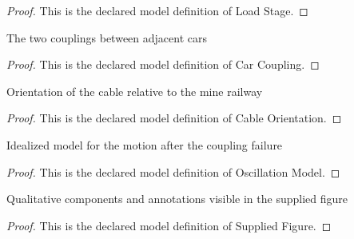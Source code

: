 \begin{proof}
  This is the declared model definition of Load Stage.
\end{proof}
\begin{definition}
  \label{def:physics:phyx-mini-0271:phyxminiproblems-problemphyxmini0271-carcoupling}
  The two couplings between adjacent cars
\end{definition}
\begin{proof}
  This is the declared model definition of Car Coupling.
\end{proof}
\begin{definition}
  \label{def:physics:phyx-mini-0271:phyxminiproblems-problemphyxmini0271-cableorientation}
  Orientation of the cable relative to the mine railway
\end{definition}
\begin{proof}
  This is the declared model definition of Cable Orientation.
\end{proof}
\begin{definition}
  \label{def:physics:phyx-mini-0271:phyxminiproblems-problemphyxmini0271-oscillationmodel}
  Idealized model for the motion after the coupling failure
\end{definition}
\begin{proof}
  This is the declared model definition of Oscillation Model.
\end{proof}
\begin{definition}
  \label{def:physics:phyx-mini-0271:phyxminiproblems-problemphyxmini0271-suppliedfigure}
  Qualitative components and annotations visible in the supplied figure
\end{definition}
\begin{proof}
  This is the declared model definition of Supplied Figure.
\end{proof}
